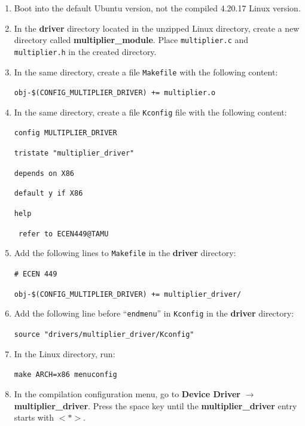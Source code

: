 \documentclass[11pt,letterpaper,titlepage]{article}
\begin{document}
\begin{enumerate}
    
    \item Boot into the default Ubuntu version, not the compiled 4.20.17 Linux version.
    
    \item In the \textbf{driver} directory located in the unzipped Linux directory, create a new directory called \textbf{multiplier\_module}. Place \texttt{multiplier.c} and \texttt{multiplier.h} in the created directory.
    
    \item In the same directory, create a file \texttt{Makefile} with the following content:
    
    \texttt{obj-\$(CONFIG\_MULTIPLIER\_DRIVER) += multiplier.o}
    
    \item In the same directory, create a file \texttt{Kconfig} file with the following content:
    
    \texttt{config MULTIPLIER\_DRIVER}
    
    \texttt{tristate "multiplier\_driver"}
    
    \texttt{depends on X86}
    
    \texttt{default y if X86}
    
    \texttt{help}
    
    \texttt{ refer to ECEN449@TAMU}
    
    \item Add the following lines to \texttt{Makefile} in the \textbf{driver} directory:
    
    \texttt{\# ECEN 449}
    
    \texttt{obj-\$(CONFIG\_MULTIPLIER\_DRIVER) += multiplier\_driver/}
    
    \item Add the following line before ``\texttt{endmenu}'' in \texttt{Kconfig} in the \textbf{driver} directory:
    
    \texttt{source "drivers/multiplier\_driver/Kconfig"}
    
    \item In the Linux directory, run:
    
    \texttt{make ARCH=x86 menuconfig}
    
    \item In the compilation configuration menu, go to \textbf{Device Driver} $\rightarrow$ \textbf{multiplier\_driver}. Press the space key until the \textbf{multiplier\_driver} entry starts with $<*>$.
    

\end{enumerate}
\end{document}
